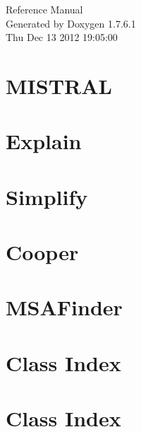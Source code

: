 \documentclass[legalpaper]{book}
\begin{document}
\hypersetup{pageanchor=false,citecolor=blue}
\begin{titlepage}
\vspace*{7cm}
\begin{center}
{\Large \-Reference \-Manual}\\
\vspace*{1cm}
{\large \-Generated by Doxygen 1.7.6.1}\\
\vspace*{0.5cm}
{\small Thu Dec 13 2012 19:05:00}\\
\end{center}
\end{titlepage}
\clearemptydoublepage
{}
\tableofcontents
\clearemptydoublepage
{}
\hypersetup{pageanchor=true,citecolor=blue}
\chapter{\-M\-I\-S\-T\-R\-A\-L}
\label{index}\hypertarget{index}{}
\chapter{\-Explain}
\label{explain}
\hypertarget{explain}{}

\chapter{\-Simplify}
\label{simplify}
\hypertarget{simplify}{}

\chapter{\-Cooper}
\label{cooper}
\hypertarget{cooper}{}

\chapter{\-M\-S\-A\-Finder}
\label{msa}
\hypertarget{msa}{}

\chapter{\-Class \-Index}

\chapter{\-Class \-Index}

\end{document}
